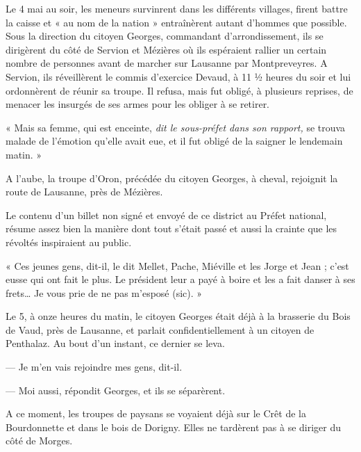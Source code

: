 \documentclass[french,twoside]{book} %
\newcommand\sic{}
\newenvironment{quoteblock}%
  {\begin{quoting}}
  {\end{quoting}}
\newenvironment{quotebar}{%
    \def\FrameCommand{{\color{rubric!10!}\vrule width 0.5em} \hspace{0.9em}}%
    \def\OuterFrameSep{\itemsep} %
    \MakeFramed {\advance\hsize-\width \FrameRestore}
  }%
  {%
    \endMakeFramed
  }
\renewenvironment{quoteblock}%
  {%
    \savenotes
    \setstretch{0.9}
    \begin{quotebar}
  }
  {%
    \end{quotebar}
    \spewnotes
  }
\begin{document}
Le 4 mai au soir, les meneurs survinrent dans les différents villages, firent battre la caisse et « au nom de la nation » entraînèrent autant d’hommes que possible. Sous la direction du citoyen Georges, commandant d’arrondissement, ils se dirigèrent du côté de Servion et Mézières où ils espéraient rallier un certain nombre de personnes avant de marcher sur Lausanne par Montpreveyres. A Servion, ils réveillèrent le commis d’exercice Devaud, à 11 ½ heures du soir et lui ordonnèrent de réunir sa troupe. Il refusa, mais fut obligé, à plusieurs reprises, de menacer les insurgés de ses armes pour les obliger à se retirer.\par

\begin{quoteblock}
\noindent « Mais sa femme, qui est enceinte, \emph{dit le sous-préfet dans son rapport, }se trouva malade de l’émotion qu’elle avait eue, et il fut obligé de la saigner le lendemain matin. »\end{quoteblock}

\noindent A l’aube, la troupe d’Oron, précédée du citoyen Georges, à cheval, rejoignit la route de Lausanne, près de Mézières.\par
Le contenu d’un billet non signé et envoyé de ce district au Préfet national, résume assez bien la manière dont tout s’était passé et aussi la crainte que les révoltés inspiraient au public.\par

\begin{quoteblock}
\noindent « Ces jeunes gens, dit-il, le dit Mellet, Pache, Miéville et les Jorge et Jean ; c’est eusse qui ont fait le plus. Le président leur a payé à boire et les a fait danser à ses frets… Je vous prie de ne pas m’esposé {{\sic (sic)}}. »\end{quoteblock}

\noindent Le 5, à onze heures du matin, le citoyen Georges était déjà à la brasserie du Bois de Vaud, près de Lausanne, et parlait confidentiellement à un citoyen de Penthalaz. Au bout d’un instant, ce dernier se leva.\par
— Je m’en vais rejoindre mes gens, dit-il.\par
— Moi aussi, répondit Georges, et ils se séparèrent.\par
A ce moment, les troupes de paysans se voyaient déjà sur le Crêt de la Bourdonnette et dans le bois de Dorigny. Elles ne tardèrent pas à se diriger du côté de Morges.
\end{document}
